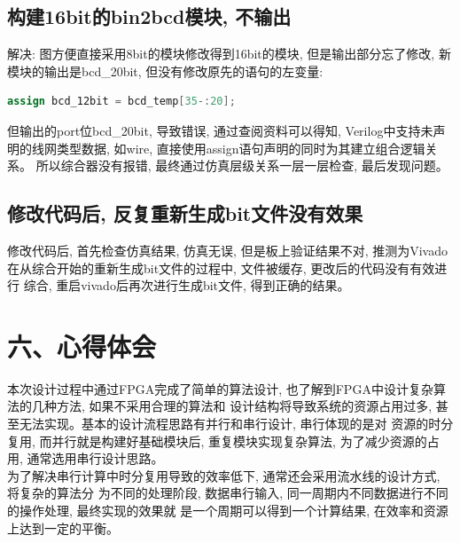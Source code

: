 \documentclass{article}
\newcommand{\fourhao}{\fontsize{14pt}{\baselineskip}\selectfont} %
\newcommand{\xiaosihao}{\fontsize{12pt}{\baselineskip}\selectfont} %
\begin{document}
\subsection*{构建16bit的bin2bcd模块, 不输出}
解决: 图方便直接采用8bit的模块修改得到16bit的模块, 但是输出部分忘了修改, 新模块的输出是bcd\_20bit, 但没有修改原先的语句的左变量:
\begin{lstlisting}[language=Verilog]
assign bcd_12bit = bcd_temp[35-:20];
\end{lstlisting}
但输出的port位bcd\_20bit, 导致错误, 通过查阅资料可以得知, Verilog中支持未声明的线网类型数据, 如wire, 直接使用assign语句声明的同时为其建立组合逻辑关系。
所以综合器没有报错, 最终通过仿真层级关系一层一层检查, 最后发现问题。
\subsection*{修改代码后, 反复重新生成bit文件没有效果}
修改代码后, 首先检查仿真结果, 仿真无误, 但是板上验证结果不对, 推测为Vivado
在从综合开始的重新生成bit文件的过程中, 文件被缓存, 更改后的代码没有有效进行
综合, 重启vivado后再次进行生成bit文件, 得到正确的结果。
\section*{\fourhao 六、心得体会}
\xiaosihao
{}
本次设计过程中通过FPGA完成了简单的算法设计, 也了解到FPGA中设计复杂算法的几种方法, 如果不采用合理的算法和
设计结构将导致系统的资源占用过多, 甚至无法实现。基本的设计流程思路有并行和串行设计, 串行体现的是对
资源的时分复用, 而并行就是构建好基础模块后, 重复模块实现复杂算法, 为了减少资源的占用, 通常选用串行设计思路。\\

为了解决串行计算中时分复用导致的效率低下, 通常还会采用流水线的设计方式, 将复杂的算法分
为不同的处理阶段, 数据串行输入, 同一周期内不同数据进行不同的操作处理, 最终实现的效果就
是一个周期可以得到一个计算结果, 在效率和资源上达到一定的平衡。\\
\end{document}
